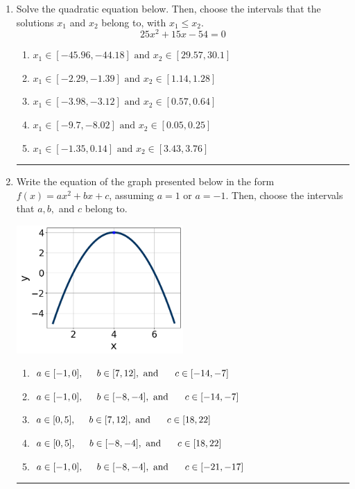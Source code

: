 \documentclass[14pt]{extbook}
\newcommand{\litem}[1]{\item#1\hspace*{-1cm}\rule{\textwidth}{0.4pt}}
\begin{document}
\begin{enumerate}
{\begin{enumerate}[label=\Alph*.]
\end{enumerate} }
\litem{
Solve the quadratic equation below. Then, choose the intervals that the solutions $x_1$ and $x_2$ belong to, with $x_1 \leq x_2$.\[ 25x^{2} +15 x -54 = 0 \]\begin{enumerate}[label=\Alph*.]
\item \( x_1 \in [-45.96, -44.18] \text{ and } x_2 \in [29.57, 30.1] \)
\item \( x_1 \in [-2.29, -1.39] \text{ and } x_2 \in [1.14, 1.28] \)
\item \( x_1 \in [-3.98, -3.12] \text{ and } x_2 \in [0.57, 0.64] \)
\item \( x_1 \in [-9.7, -8.02] \text{ and } x_2 \in [0.05, 0.25] \)
\item \( x_1 \in [-1.35, 0.14] \text{ and } x_2 \in [3.43, 3.76] \)

\end{enumerate} }
\litem{
Write the equation of the graph presented below in the form $f(x)=ax^2+bx+c$, assuming  $a=1$ or $a=-1$. Then, choose the intervals that $a, b,$ and $c$ belong to.
\begin{center}
    \includegraphics[width=0.5\textwidth]{../Figures/quadraticGraphToEquationCopyA.png}
\end{center}
\begin{enumerate}[label=\Alph*.]
\item \( a \in [-1, 0], \hspace*{5mm} b \in [7, 12], \text{ and } \hspace*{5mm} c \in [-14, -7] \)
\item \( a \in [-1, 0], \hspace*{5mm} b \in [-8, -4], \text{ and } \hspace*{5mm} c \in [-14, -7] \)
\item \( a \in [0, 5], \hspace*{5mm} b \in [7, 12], \text{ and } \hspace*{5mm} c \in [18, 22] \)
\item \( a \in [0, 5], \hspace*{5mm} b \in [-8, -4], \text{ and } \hspace*{5mm} c \in [18, 22] \)
\item \( a \in [-1, 0], \hspace*{5mm} b \in [-8, -4], \text{ and } \hspace*{5mm} c \in [-21, -17] \)


\end{enumerate}}
\end{enumerate}
\end{document}
